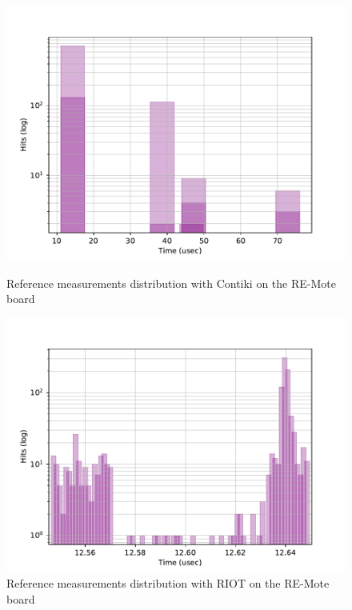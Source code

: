 \begin{figure}[!ht]
        \centering
        \includegraphics[scale=.7]{assets/reference-value-contiki-remote.pdf}
        \caption{Reference measurements distribution with Contiki on the RE-Mote board\label{fig:reference-value-contiki-remote}}
        \centering
        \includegraphics[scale=.7]{assets/reference-value-riot-remote.pdf}
        \caption{Reference measurements distribution with RIOT on the RE-Mote board\label{fig:reference-value-riot-remote}}
\end{figure}

